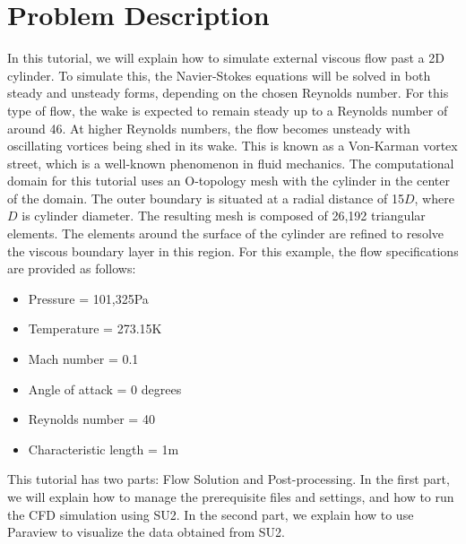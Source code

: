 \section*{Problem Description}
In this tutorial, we will explain how to simulate external viscous flow past a 2D cylinder. To simulate this, the Navier-Stokes equations will be solved in both steady and unsteady forms, depending on the chosen Reynolds number. For this type of flow, the wake is expected to remain steady up to a Reynolds number of around 46. At higher Reynolds numbers, the flow becomes unsteady with oscillating vortices being shed in its wake. This is known as a Von-Karman vortex street, which is a well-known phenomenon in fluid mechanics. The computational domain for this tutorial uses an O-topology mesh with the cylinder in the center of the domain. The outer boundary is situated at a radial distance of 15$D$, where $D$ is cylinder diameter. The resulting mesh is composed of 26,192 triangular elements. The elements around the surface of the cylinder are refined to resolve the viscous boundary layer in this region.  For this example, the flow specifications are provided as follows:
\begin{itemize}
    \item Pressure = 101,325Pa
    \item Temperature = 273.15K
    \item Mach number = 0.1
    \item Angle of attack = 0 degrees
    \item Reynolds number = 40
    \item Characteristic length = 1m
\end{itemize}
This tutorial has two parts: Flow Solution and Post-processing. In the first part, we will explain how to manage the prerequisite files and settings, and how to run the CFD simulation using SU2. In the second part, we explain how to use Paraview to visualize the data obtained from SU2.
